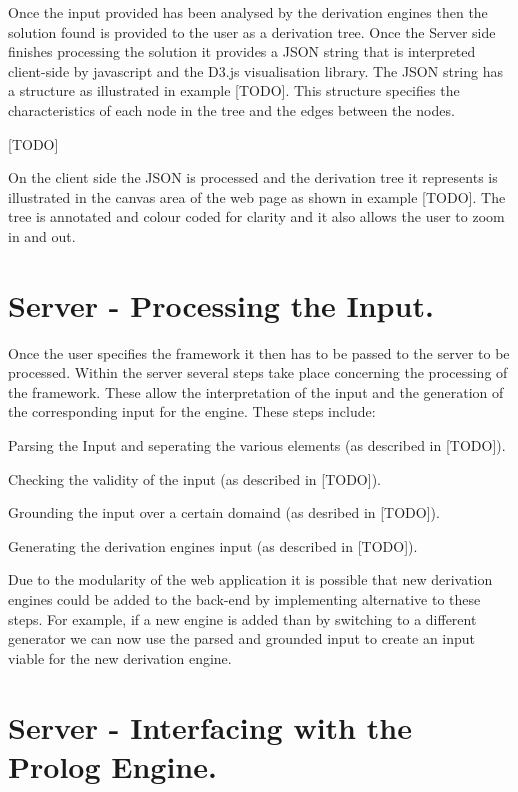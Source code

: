 Once the input provided has been analysed by the derivation engines then the solution found is provided to the user as a derivation tree. Once the Server side finishes processing the solution it provides a JSON string that is interpreted client-side by javascript and the D3.js visualisation library. The JSON string has a structure as illustrated in example [TODO]. This structure specifies the characteristics of each node in the tree and the edges between the nodes.

[TODO]

On the client side the JSON is processed and the derivation tree it represents is illustrated in the canvas area of the web page as shown in example [TODO]. The tree is annotated and colour coded for clarity and it also allows the user to zoom in and out.

\section{Server - Processing the Input.}

Once the user specifies the framework it then has to be passed to the server to be processed. Within the server several steps take place concerning the processing of the framework. These allow the interpretation of the input and the generation of the corresponding input for the engine. These steps include:

\begin{itemize*}
\item Parsing the Input and seperating the various elements (as described in [TODO]).
\item Checking the validity of the input (as described in [TODO]).
\item Grounding the input over a certain domaind (as desribed in [TODO]).
\item Generating the derivation engines input (as described in [TODO]).
\end{itemize*}

Due to the modularity of the web application it is possible that new derivation engines could be added to the back-end by implementing alternative to these steps. For example, if a new engine is added than by switching to a different generator we can now use the parsed and grounded input to create an input viable for the new derivation engine.

\section{Server - Interfacing with the Prolog Engine.}

